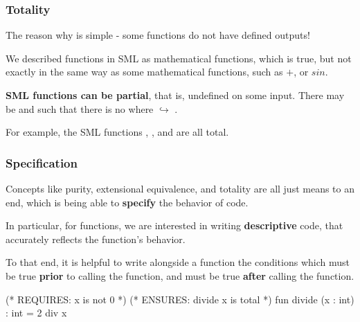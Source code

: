 \documentclass[aspectratio=169]{beamer}
\begin{document}
\begin{frame}[fragile]
  \frametitle{Totality}

  The reason why is simple - some functions do not have defined outputs!

  \pause
  \vspace{\fill}

  We described functions in SML as mathematical functions, which is true, but not exactly in the
  same way as some mathematical functions, such as $+$, or $sin$.

  \pause
  \vspace{5pt}

  \textbf{SML functions can be partial}, that is, undefined on some input. There may be 
  and  such that there is no  where  $\hookrightarrow$ .  

  \pause
  \vspace{\fill}


  \vspace{5pt}

  For example, the SML functions \code{+}, , and \code{^} are all total.
\end{frame}

\begin{frame}[fragile]
  \frametitle{Specification}

  Concepts like purity, extensional equivalence, and totality are all just means to
  an end, which is being able to \textbf{specify} the behavior of code.

  \pause
  \vspace{\fill}

  In particular, for functions, we are interested in writing \textbf{descriptive} code,
  that accurately reflects the function's behavior.
  
  \pause
  \vspace{5pt}

  To that end, it is helpful to write alongside a function the conditions which 
  must be true \textbf{prior} to calling the function, and must be true \textbf{after}
  calling the function.

  \pause
  \vspace{\fill}

  \begin{codeblock}
    (* REQUIRES: x is not 0 *)
    (* ENSURES: divide x is total *)
    fun divide (x : int) : int = 2 div x 
  \end{codeblock}
\end{frame}
\end{document}
